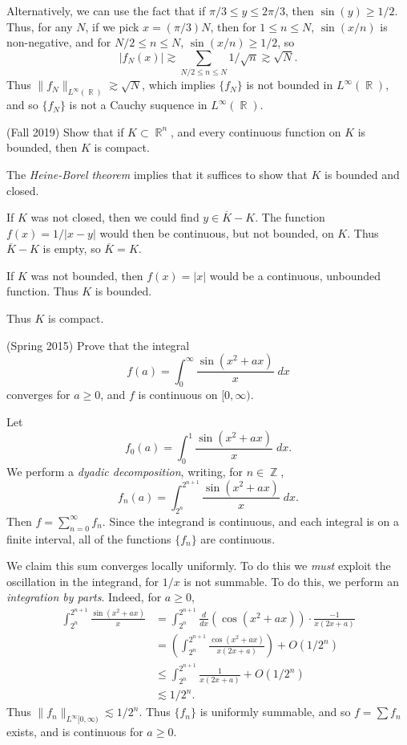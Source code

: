 \documentclass[answers]{exam}
\DeclareMathOperator{\RR}{\mathbb{R}}
\DeclareMathOperator{\ZZ}{\mathbb{Z}}
\theoremstyle{problemstyle}
\newcommand{\1}[1]{\textbf{1}_{\left[#1\right]}} %
\begin{document}
\begin{questions}
\begin{parts}
\begin{solution}
		Alternatively, we can use the fact that if $\pi/3 \leq y \leq 2\pi/3$, then $\sin(y) \geq 1/2$. Thus, for any $N$, if we pick $x = (\pi/3)N$, then for $1 \leq n \leq N$, $\sin(x/n)$ is non-negative, and for $N/2 \leq n \leq N$, $\sin(x/n) \geq 1/2$, so
		\[ |f_N(x)| \gtrsim \sum_{N/2 \leq n \leq N} 1/\sqrt{n} \gtrsim \sqrt{N}. \]
		Thus $\| f_N \|_{L^\infty(\RR)} \gtrsim \sqrt{N}$, which implies $\{ f_N \}$ is not bounded in $L^\infty(\RR)$, and so $\{ f_N \}$ is not a Cauchy suquence in $L^\infty(\RR)$.
	\end{solution}
\end{parts}

\question (Fall 2019) Show that if $K \subset \RR^n$, and every continuous function on $K$ is bounded, then $K$ is compact.
\begin{solution}
	The \emph{Heine-Borel theorem} implies that it suffices to show that $K$ is bounded and closed.

	If $K$ was not closed, then we could find $y \in \overline{K} - K$. The function $f(x) = 1/|x-y|$ would then be continuous, but not bounded, on $K$. Thus $\overline{K} - K$ is empty, so $\overline{K} = K$.

	If $K$ was not bounded, then $f(x) = |x|$ would be a continuous, unbounded function. Thus $K$ is bounded.

	Thus $K$ is compact.
\end{solution}

\question (Spring 2015) Prove that the integral
%
\[ f(a) = \int_0^\infty \frac{\sin(x^2 + ax)}{x}\; dx \]
%
converges for $a \geq 0$, and $f$ is continuous on $[0,\infty)$.
\begin{solution}
	Let
	\[ f_0(a) = \int_0^1 \frac{\sin(x^2 + ax)}{x}\; dx. \]
	We perform a \emph{dyadic decomposition}, writing, for $n \in \ZZ$,
	\[ f_n(a) = \int_{2^n}^{2^{n+1}} \frac{\sin(x^2 + ax)}{x}\; dx. \]
	Then $f = \sum_{n = 0}^\infty f_n$. Since the integrand is continuous, and each integral is on a finite interval, all of the functions $\{ f_n \}$ are continuous.

	We claim this sum converges locally uniformly. To do this we \emph{must} exploit the oscillation in the integrand, for $1/x$ is not summable. To do this, we perform an \emph{integration by parts}. Indeed, for $a \geq 0$,
	\begin{align*}
		\int_{2^n}^{2^{n+1}} \frac{\sin(x^2 + ax)}{x} &= \int_{2^n}^{2^{n+1}} \frac{d}{dx} \left( \cos(x^2 + ax) \right) \cdot \frac{-1}{x(2x + a)}\\
		&= \left( \int_{2^n}^{2^{n+1}} \frac{\cos(x^2 + ax)}{x(2x + a)} \right) + O(1/2^n)\\
		&\leq \int_{2^n}^{2^{n+1}} \frac{1}{x(2x + a)} + O(1/2^n)\\
		&\lesssim 1/2^n.
	\end{align*}
	Thus $\| f_n \|_{L^\infty[0,\infty)} \lesssim 1/2^n$. Thus $\{ f_n \}$ is uniformly summable, and so $f = \sum f_n$ exists, and is continuous for $a \geq 0$.


\end{solution}
\end{questions}
\end{document}
